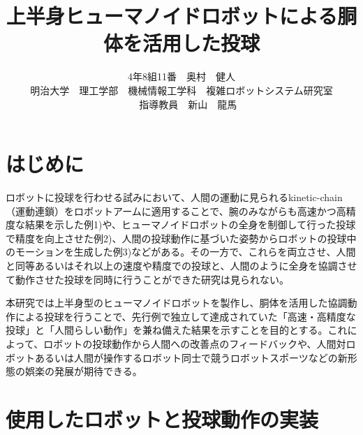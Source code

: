 \documentclass[9pt, twocolumn, a4paper]{jsarticle_kijou}
\title{上半身ヒューマノイドロボットによる胴体を活用した投球}
\author{
4年8組11番　奥村　健人\\ %
明治大学　理工学部　機械情報工学科　複雑ロボットシステム研究室\\　%
指導教員　新山　龍馬　%
}
\date{}
\begin{document}
\maketitle


\section{はじめに}
ロボットに投球を行わせる試みにおいて、人間の運動に見られるkinetic-chain（運動連鎖）をロボットアームに適用することで、腕のみながらも高速かつ高精度な結果を示した例1)や、ヒューマノイドロボットの全身を制御して行った投球で精度を向上させた例2)、人間の投球動作に基づいた姿勢からロボットの投球中のモーションを生成した例3)などがある。その一方で、これらを両立させ、人間と同等あるいはそれ以上の速度や精度での投球と、人間のように全身を協調させて動作させた投球を同時に行うことができた研究は見られない。\par
本研究では上半身型のヒューマノイドロボットを製作し、胴体を活用した協調動作による投球を行うことで、先行例で独立して達成されていた「高速・高精度な投球」と「人間らしい動作」を兼ね備えた結果を示すことを目的とする。これによって、ロボットの投球動作から人間への改善点のフィードバックや、人間対ロボットあるいは人間が操作するロボット同士で競うロボットスポーツなどの新形態の娯楽の発展が期待できる。\par

\section{使用したロボットと投球動作の実装}
\end{document}
